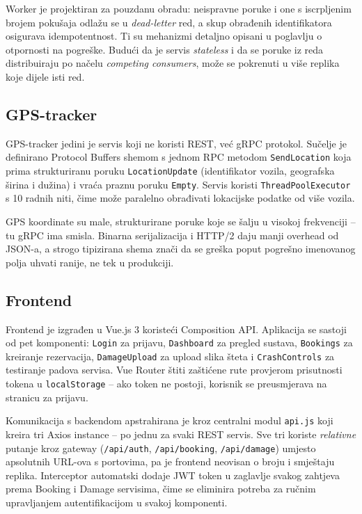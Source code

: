 \documentclass[12pt,a4paper]{article}
\begin{document}
Worker je projektiran za pouzdanu obradu: neispravne poruke i one s iscrpljenim brojem pokušaja odlažu se u \emph{dead-letter} red, a skup obrađenih identifikatora osigurava idempotentnost. Ti su mehanizmi detaljno opisani u poglavlju o otpornosti na pogreške. Budući da je servis \emph{stateless} i da se poruke iz reda distribuiraju po načelu \emph{competing consumers}, može se pokrenuti u više replika koje dijele isti red.

\subsection{GPS-tracker}

GPS-tracker jedini je servis koji ne koristi REST, već gRPC protokol. Sučelje je definirano Protocol Buffers shemom s jednom RPC metodom \texttt{SendLocation} koja prima strukturiranu poruku \texttt{LocationUpdate} (identifikator vozila, geografska širina i dužina) i vraća praznu poruku \texttt{Empty}. Servis koristi \texttt{ThreadPoolExecutor} s 10 radnih niti, čime može paralelno obrađivati lokacijske podatke od više vozila.

GPS koordinate su male, strukturirane poruke koje se šalju u visokoj frekvenciji -- tu gRPC ima smisla. Binarna serijalizacija i HTTP/2 daju manji overhead od JSON-a, a strogo tipizirana shema znači da se greška poput pogrešno imenovanog polja uhvati ranije, ne tek u produkciji.

\subsection{Frontend}

Frontend je izgrađen u Vue.js 3 koristeći Composition API. Aplikacija se sastoji od pet komponenti: \texttt{Login} za prijavu, \texttt{Dashboard} za pregled sustava, \texttt{Bookings} za kreiranje rezervacija, \texttt{DamageUpload} za upload slika šteta i \texttt{CrashControls} za testiranje padova servisa. Vue Router štiti zaštićene rute provjerom prisutnosti tokena u \texttt{localStorage} -- ako token ne postoji, korisnik se preusmjerava na stranicu za prijavu.

Komunikacija s backendom apstrahirana je kroz centralni modul \texttt{api.js} koji kreira tri Axios instance -- po jednu za svaki REST servis. Sve tri koriste \emph{relativne} putanje kroz gateway (\texttt{/api/auth}, \texttt{/api/booking}, \texttt{/api/damage}) umjesto apsolutnih URL-ova s portovima, pa je frontend neovisan o broju i smještaju replika. Interceptor automatski dodaje JWT token u zaglavlje svakog zahtjeva prema Booking i Damage servisima, čime se eliminira potreba za ručnim upravljanjem autentifikacijom u svakoj komponenti.
\end{document}
